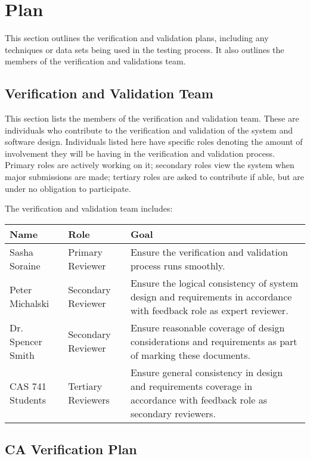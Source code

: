 \documentclass[12pt, titlepage]{article}
\begin{document}
\section{Plan}
This section outlines the verification and validation plans, including any 
techniques or data sets being used in the testing process. It also outlines the 
members of the verification and validations team.
	
\subsection{Verification and Validation Team}
This section lists the members of the verification and validation team. These 
are individuals who contribute to the verification and validation of the system 
and software design. Individuals listed here have specific roles denoting the 
amount of involvement they will be having in the verification and validation 
process. Primary roles are actively working on it; secondary roles view the 
system when major submissions are made; tertiary roles are asked to contribute 
if able, but are under no obligation to participate.

The verification and validation team includes:

\begin{table}[h]
	\begin{tabular}{|l|l|p{9cm}|}
		\hline
		\textbf{Name} & \textbf{Role} & \textbf{Goal} \\
		\hline
		Sasha Soraine & Primary Reviewer& Ensure the verification and 
		validation 
		process runs smoothly.\\
		Peter Michalski & Secondary Reviewer& Ensure the logical consistency of 
		system 
		design and requirements in accordance with feedback role as expert 
		reviewer. \\
		Dr. Spencer Smith & Secondary Reviewer& Ensure reasonable coverage of 
		design 
		considerations and requirements as part of marking these documents. \\
		CAS 741 Students & Tertiary Reviewers& Ensure general consistency in 
		design and 
		requirements coverage in accordance with feedback role as secondary 
		reviewers.\\
		\hline
	\end{tabular}
\end{table}

\pagebreak
\subsection{CA Verification Plan}
\end{document}
